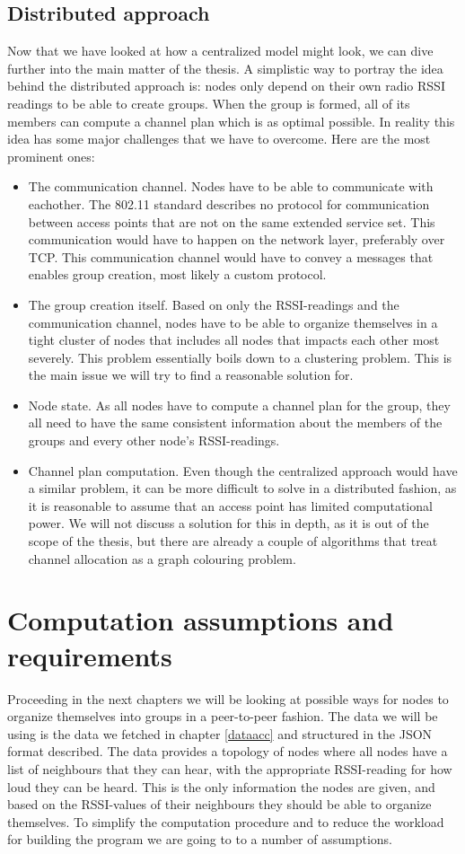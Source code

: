 \subsection{Distributed approach}
Now that we have looked at how a centralized model might look, we can dive further into the main matter of the thesis. A simplistic way to portray the idea behind
the distributed approach is: nodes only depend on their own radio RSSI readings to be able to create groups. When the group is formed, all of its members can
compute a channel plan which is as optimal possible. In reality this idea has some major challenges that we have to overcome. Here are the most prominent ones: 
\begin{itemize}
	\item The communication channel. Nodes have to be able to communicate with eachother. The 802.11 standard describes no protocol for communication between access points that are not on the same extended service set. This communication would have to happen on the network layer, preferably over TCP. This communication channel would have to convey a messages that enables group creation,
		most likely a custom protocol. 
	\item The group creation itself. Based on only the RSSI-readings and the communication channel, nodes have to be able to organize themselves in a tight cluster of nodes that
		includes all nodes that impacts each other most severely. This problem essentially boils down to a clustering problem. This is the main issue we will
		try to find a reasonable solution for. 
	\item Node state. As all nodes have to compute a channel plan for the group, they all need to have the same consistent information about the members of the groups
		and every other node's RSSI-readings. 
	\item Channel plan computation. Even though the centralized approach would have a similar problem, it can be more difficult to solve in a distributed fashion, as 
		it is reasonable to assume that an access point has limited computational power. We will not discuss a solution for this in depth, as it is out of the scope
		of the thesis, but there are already a couple of algorithms that treat channel allocation as a graph colouring problem. 
\end{itemize}


\section{Computation assumptions and requirements}
Proceeding in the next chapters we will be looking at possible ways for nodes to organize themselves into groups in a peer-to-peer fashion.
The data we will be using is the data we fetched in chapter \ref{dataacc} and structured in the JSON format described. The data provides
a topology of nodes where all nodes have a list of neighbours that they can hear, with the appropriate RSSI-reading for how loud they can be heard.   
This is the only information the nodes are given, and based on the RSSI-values of their neighbours they should be able to organize themselves. 
To simplify the computation procedure and to reduce the workload for building the program we are going to to a number of assumptions. 

